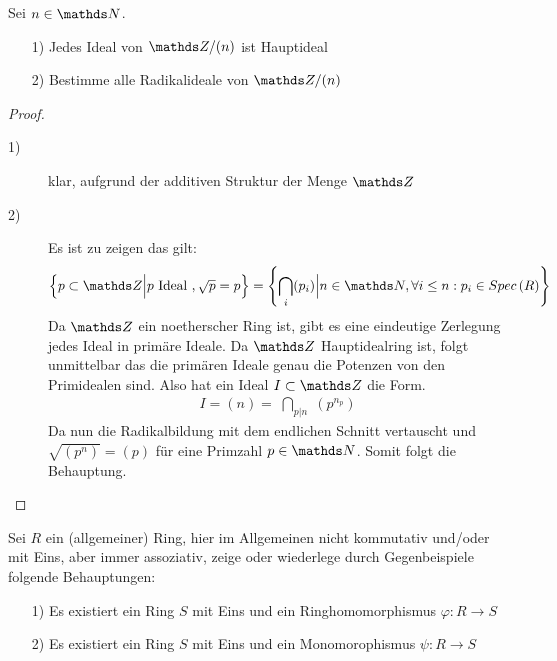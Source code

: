 \documentclass[ngerman, parskip=half, titlepage=false]{scrartcl}
\begin{document}
\begin{Lem}
  Sei $n \in \N$.\\
  \begin{itemize}
    \item[1)] Jedes Ideal von $\Z/(n)$ ist Hauptideal
    \item[2)] Bestimme alle Radikalideale von $\Z/(n)$
  \end{itemize}
  \begin{proof}
    \begin{description}
      \item[1)] klar, aufgrund der additiven Struktur der Menge $\Z$
      \item[2)] Es ist zu zeigen das gilt:\\
        \begin{gather*}
          \left\{ p \subset \Z \Big| p \text{ Ideal } , \sqrt{p} = p
          \right\} =  \left\{ \bigcap_i (p_i) \Big| n \in \N ,
            \forall i \leq n : p_i \in \spec{R} \right\}
        \end{gather*}
        Da $\Z$ ein noetherscher Ring ist, gibt es eine eindeutige Zerlegung
        jedes Ideal in primäre Ideale. Da $\Z$ Hauptidealring ist, folgt
        unmittelbar das die primären Ideale genau die Potenzen von den 
        Primidealen sind. Also hat ein Ideal $I \subset \Z$ die Form.
        \begin{gather*}
          I = (n) = \; \bigcap\limits_{p | n} \; (p^{n_p} ) \;
        \end{gather*}
        Da nun die Radikalbildung mit dem endlichen Schnitt vertauscht und
        $\sqrt{(p^n)} = (p) $ für eine Primzahl $p \in \N$. Somit folgt die
        Behauptung.
      \end{description}
  \end{proof}
\end{Lem}

\begin{Satz}
  Sei $R$ ein (allgemeiner) Ring, hier im Allgemeinen nicht kommutativ
  und/oder mit Eins, aber immer assoziativ, zeige oder wiederlege
  durch Gegenbeispiele folgende Behauptungen:
  \begin{itemize}
    \item[1)] Es existiert ein Ring $S$ mit Eins und ein Ringhomomorphismus 
      $\varphi : R \rightarrow S$
    \item[2)] Es existiert ein Ring $S$ mit Eins und ein Monomorophismus
      $\psi : R \rightarrow S$
  \end{itemize}
\end{Satz}
\end{document}
